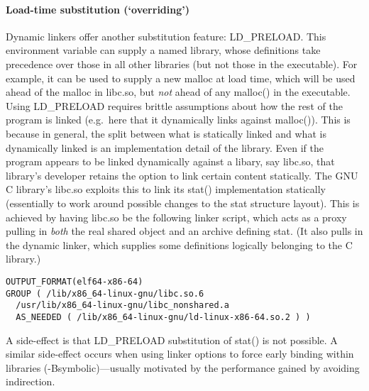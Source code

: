\documentclass[preprint,10pt]{sigplanconf-pldi16}
\begin{document}
\paragraph{Load-time substitution (`overriding')}
Dynamic linkers offer another substitution feature: \textsf{LD\_PRELOAD}. 
This environment variable can supply a named library, 
whose definitions take precedence over those in all other
libraries (but not those in the executable). 
For example, it can be used to supply a new \textsf{malloc} at load time, which will be used ahead of the \textsf{malloc} in \textsf{libc.so}, but \emph{not} ahead of any \textsf{malloc()} in the executable.
Using \textsf{LD\_PRELOAD} requires brittle assumptions about how the rest of the program is linked (e.g.\ here that it dynamically links against \textsf{malloc()}). This is because 
in general, the split between what is statically linked and what is dynamically linked is an implementation detail of the library. 
Even if the program appears to be linked dynamically against a libary, say \textsf{libc.so}, that library's developer retains the option to link certain content statically.
The GNU C library's \textsf{libc.so} exploits this to link its \textsf{stat()} implementation statically (essentially to work around possible changes to the \textsf{stat} structure layout).
This is achieved by having \textsf{libc.so} be the following linker script, which acts as a proxy pulling in \emph{both} the real shared object and an archive defining \textsf{stat}.
(It also pulls in the dynamic linker, which supplies some definitions logically belonging to the C library.)

{\scriptsize\begin{lstlisting}[language=plain,basicstyle=\sffamily,columns=flexible]
OUTPUT_FORMAT(elf64-x86-64)
GROUP ( /lib/x86_64-linux-gnu/libc.so.6 
  /usr/lib/x86_64-linux-gnu/libc_nonshared.a
  AS_NEEDED ( /lib/x86_64-linux-gnu/ld-linux-x86-64.so.2 ) )
\end{lstlisting}}

\noindent{}A side-effect is that \textsf{LD\_PRELOAD} substitution of \textsf{stat()} is not possible.
A similar side-effect occurs when using linker options to force early binding within libraries (\textsf{-Bsymbolic})---usually motivated by the performance gained by avoiding indirection. 
\end{document}
